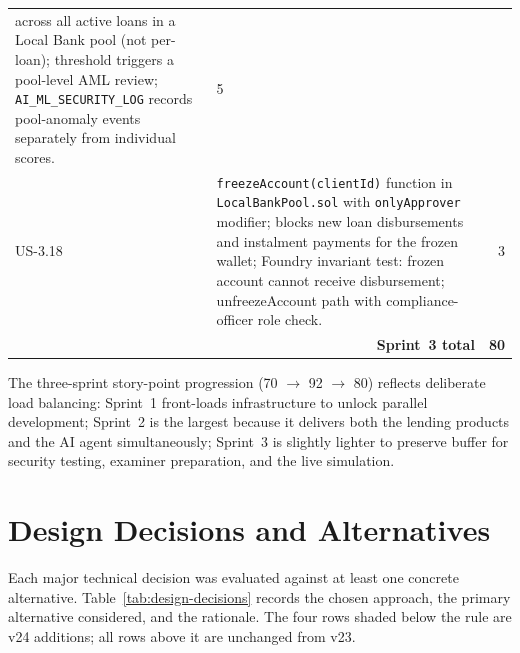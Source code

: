 \begin{table}[H]
\begin{tabular}{p{1.3cm}p{10.2cm}r}
  across all active loans in a Local Bank pool (not per-loan); threshold
  triggers a pool-level AML review; \texttt{AI\_ML\_SECURITY\_LOG} records
  pool-anomaly events separately from individual scores. & 5 \\
US-3.18 & \texttt{freezeAccount(clientId)} function in
  \texttt{LocalBankPool.sol} with \texttt{onlyApprover} modifier;
  blocks new loan disbursements and instalment payments for the frozen
  wallet; Foundry invariant test: frozen account cannot receive
  disbursement; unfreezeAccount path with compliance-officer role check. & 3 \\
\hline
\multicolumn{2}{r}{\textbf{Sprint~3 total}} & \textbf{80} \\
\hline
\end{tabular}
\end{table}

\noindent The three-sprint story-point progression (70 $\to$ 92 $\to$ 80)
reflects deliberate load balancing: Sprint~1 front-loads infrastructure
to unlock parallel development; Sprint~2 is the largest because it delivers
both the lending products and the AI agent simultaneously; Sprint~3 is
slightly lighter to preserve buffer for security testing, examiner
preparation, and the live simulation.

\section{Design Decisions and Alternatives}
\label{sec:design-decisions}

Each major technical decision was evaluated against at least one concrete
alternative. Table~\ref{tab:design-decisions} records the chosen approach,
the primary alternative considered, and the rationale. The four rows shaded
below the rule are v24 additions; all rows above it are unchanged from v23.

